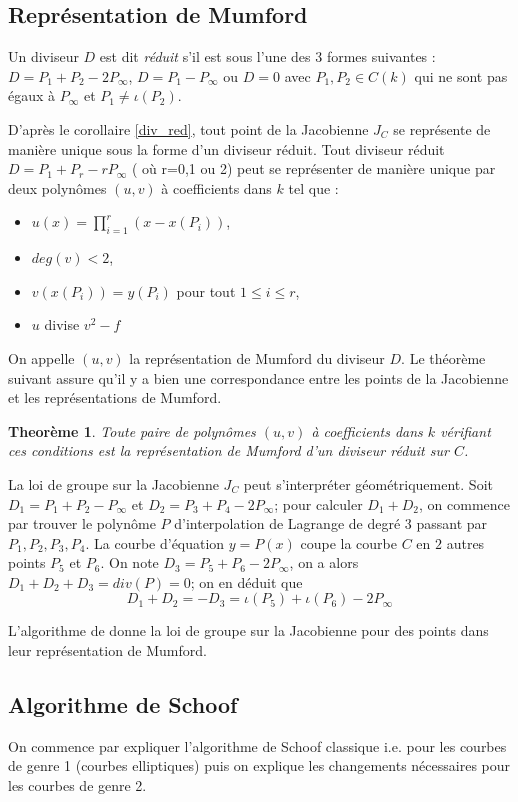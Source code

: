 \documentclass[a4paper]{article}
\newtheorem{theoreme}{Theorème}[section]
\theoremstyle{definition}
\theoremstyle{remark}
\numberwithin{equation}{section}
\begin{document}
\subsection{Représentation de Mumford}
Un diviseur $D$ est dit \emph{réduit} s'il est sous l'une des 3 formes suivantes : $D = P_1 + P_2 - 2P_\infty$, $D = P_1 - P_\infty$ ou $D=0$ avec $P_1,P_2 \in C(k)$ qui ne sont pas égaux à $P_\infty$ et $P_1 \neq \iota(P_2)$.

D'après le corollaire \eqref{div_red}, tout point de la Jacobienne $J_C$ se représente de manière unique sous la forme d'un diviseur réduit. Tout diviseur réduit $D = P_1 + P_r - rP_\infty$ ( où r=0,1 ou 2) peut se représenter de manière unique par deux polynômes $(u,v)$ à coefficients dans $k$ tel que :
\begin{itemize}
\item $u(x) =  \prod_{i=1}^r (x - x(P_i) )$,
\item $deg(v) < 2$,
\item $v(x(P_i)) = y(P_i)$ pour tout $1 \leq i \leq r$,
\item $u$ divise $v^2 - f$
\end{itemize}
On appelle $(u,v)$ la représentation de Mumford du diviseur $D$.
Le théorème suivant assure qu'il y a bien une correspondance entre les points de la Jacobienne et les représentations de Mumford.

\begin{theoreme}
Toute paire de polynômes $(u,v)$ à coefficients dans $k$ vérifiant ces conditions est la représentation de Mumford d'un diviseur réduit sur $C$.
\end{theoreme}

La loi de groupe sur la Jacobienne $J_C$ peut s'interpréter géométriquement. Soit $D_1 = P_1 + P_2 - P_\infty$ et $D_2 = P_3 + P_4 - 2P_\infty$; pour calculer $D_1 + D_2$, on commence par trouver le polynôme $P$ d'interpolation de Lagrange de degré $3$ passant par $P_1,P_2,P_3,P_4$. La courbe d'équation $y = P(x)$ coupe la courbe $C$ en $2$ autres points $P_5$ et $P_6$. On note $D_3 = P_5 + P_6 - 2P_\infty$, on a alors $D_1 + D_2 + D_3 = div(P) = 0$; on en déduit que
$$D_1 + D_2 = -D_3 = \iota(P_5) + \iota(P_6) - 2P_\infty$$

L'algorithme de \citet{cantor} donne la loi de groupe sur la Jacobienne pour des points dans leur représentation de Mumford.

\subsection{Algorithme de Schoof}
\label{algoSchoof}
On commence par expliquer l'algorithme de Schoof classique i.e. pour les courbes de genre 1 (courbes elliptiques) puis on explique les changements nécessaires pour les courbes de genre 2.
\end{document}
